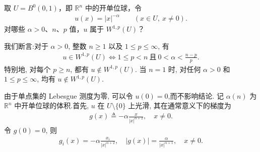 \documentclass[../../main.tex]{subfiles}
\begin{document}
\begin{example}\label{example:ch05-径向奇异}
取 $U=B^{0}(0,1)$，即 $\mathbb{R}^{n}$ 中的开单位球，令
\begin{align*}
u(x)=|x|^{-\alpha}\qquad (x\in U,\ x\neq 0).
\end{align*}
对哪些 $\alpha>0$、$n$、$p$ 值，$u$ 属于 $W^{1,p}(U)$？
\end{example}
\begin{solution}

我们断言:对于 $\alpha>0$, 整数 $n\geqslant1$ 以及
$1\leqslant p\leqslant\infty$, 有
\begin{align*}
u\in W^{1,p}(U)
\Longleftrightarrow
1\leqslant p<n
\ \text{且}\
0<\alpha<\frac{n-p}{p}.
\end{align*}
特别地, 对每个 $p\geqslant n$, 都有 $u\notin W^{1,p}(U)$.
当 $n=1$ 时, 对任何 $\alpha>0$ 和 $1\leqslant p\leqslant\infty$, 均有
$u\notin W^{1,p}(U)$.

由于单点集的 Lebesgue 测度为零, 可以令 $u(0)=0$,而不影响结论. 
记 $\alpha(n)$ 为 $\mathbb{R}^n$ 中开单位球的体积.首先, $u$ 在 $U\setminus\{0\}$ 上光滑, 其在通常意义下的梯度为
\begin{align*}
g(x)\triangleq-\alpha\frac{x}{|x|^{\alpha+2}},
\quad x\neq0.
\end{align*}
令 $g(0)=0$, 则
\begin{align*}
g_i(x)=-\alpha\frac{x_i}{|x|^{\alpha+2}},
\quad
|g(x)|=\frac{\alpha}{|x|^{\alpha+1}},
\quad x\neq0.
\end{align*}


\end{solution}
\end{document}
